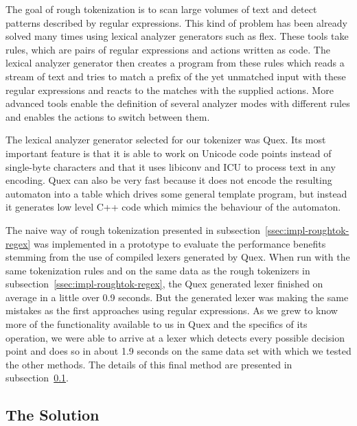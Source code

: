 The goal of rough tokenization is to scan large volumes of text and detect
patterns described by regular expressions. This kind of problem has been
already solved many times using lexical analyzer generators such as flex. These
tools take rules, which are pairs of regular expressions and actions written as
code. The lexical analyzer generator then creates a program from these rules
which reads a stream of text and tries to match a prefix of the yet unmatched
input with these regular expressions and reacts to the matches with the
supplied actions. More advanced tools enable the definition of several analyzer
modes with different rules and enables the actions to switch between them.

The lexical analyzer generator selected for our tokenizer was Quex. Its most
important feature is that it is able to work on Unicode code points instead of
single-byte characters and that it uses libiconv and ICU to process text in any
encoding. Quex can also be very fast because it does not encode the resulting
automaton into a table which drives some general template program, but instead
it generates low level C++ code which mimics the behaviour of the automaton.

The naive way of rough tokenization presented in
subsection~\ref{ssec:impl-roughtok-regex} was implemented in a prototype to
evaluate the performance benefits stemming from the use of compiled lexers
generated by Quex. When run with the same tokenization rules and on the same
data as the rough tokenizers in subsection~\ref{ssec:impl-roughtok-regex}, the
Quex generated lexer finished on average in a little over 0.9 seconds. But the
generated lexer was making the same mistakes as the first approaches using
regular expressions. As we grew to know more of the functionality available to
us in Quex and the specifics of its operation, we were able to arrive at a
lexer which detects every possible decision point and does so in about 1.9
seconds on the same data set with which we tested the other methods. The
details of this final method are presented in
subsection~\ref{ssec:impl-roughtok-solution}.

\subsection{The Solution}
\label{ssec:impl-roughtok-solution}

